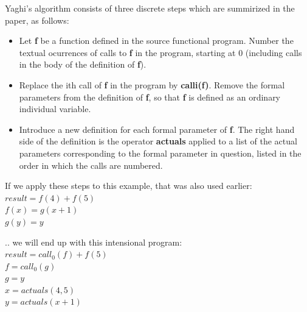 \documentclass[ack,preface]{dithesis}
\begin{document}
Yaghi's algorithm consists of three discrete steps which are summirized in the paper, as follows:
    \begin{itemize}
    \item Let \textbf{f} be a function defined in the source functional program. Number the textual ocurrences of calls to \textbf{f} in the program, starting at 0 (including calls in the body of the definition of \textbf{f}).
   
   \item Replace the ith call of \textbf{f} in the program by \textbf{calli(f)}. Remove the formal parameters from the definition of \textbf{f}, so that \textbf{f} is defined as an ordinary individual variable.
   
   \item Introduce a new definition for each formal parameter of \textbf{f}. The right hand side of the definition is the operator \textbf{actuals} applied to a list of the actual parameters corresponding to the formal parameter in question, listed in the order in which the calls are numbered.
    \end{itemize}


\begin{flushleft}
If we apply these steps to this example, that was also used earlier:\\
 \setlength{\parindent}{25ex} $result = f(4) + f(5)$ \\
$f(x) = g(x+1)$ \\ 
$g(y) = y$
\end{flushleft}


\begin{flushleft}
.. we will end up with this intensional program:\\
 \setlength{\parindent}{25ex} $result = call_0(f) + f(5)$ \\
$f = call_0(g)$ \\ 
$g = y$ \\
$x = actuals(4,5)$ \\
$y = actuals(x+1)$ \\
\end{flushleft}
\end{document}
